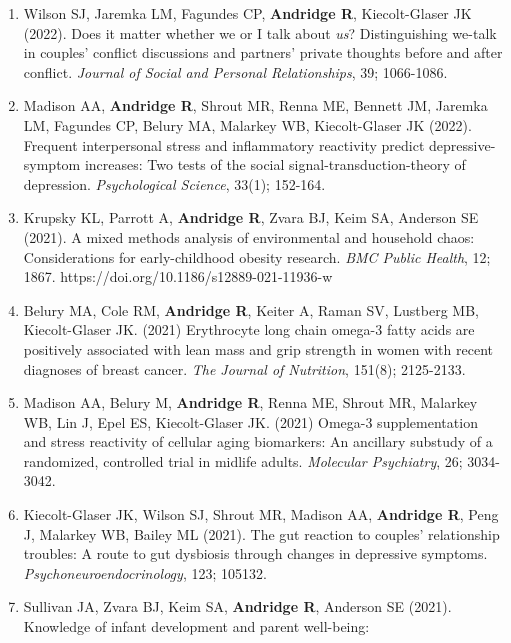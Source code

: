 \documentclass[
  english,
  letterpaper,
  DIV=11,
  numbers=noendperiod]{scrartcl}
\begin{document}
\begin{enumerate}
  \textbf{Andridge R}, Lustberg M, DeVries AC, Orchard T. (2022) Effects
  of plant-based versus marine-based omega-3 fatty acids and sucrose on
  brain and liver fatty acids in a mouse model of chemotherapy.
  \emph{Nutritional Neuroscience}, 25(12); 2650-2658.
\item
  Wilson SJ, Jaremka LM, Fagundes CP, \textbf{Andridge R},
  Kiecolt-Glaser JK (2022). Does it matter whether we or I talk about
  \emph{us}? Distinguishing we-talk in couples' conflict discussions and
  partners' private thoughts before and after conflict. \emph{Journal of
  Social and Personal Relationships}, 39; 1066-1086.
\item
  Madison AA, \textbf{Andridge R}, Shrout MR, Renna ME, Bennett JM,
  Jaremka LM, Fagundes CP, Belury MA, Malarkey WB, Kiecolt-Glaser JK
  (2022). Frequent interpersonal stress and inflammatory reactivity
  predict depressive-symptom increases: Two tests of the social
  signal-transduction-theory of depression. \emph{Psychological
  Science}, 33(1); 152-164.
\item
  Krupsky KL, Parrott A, \textbf{Andridge R}, Zvara BJ, Keim SA,
  Anderson SE (2021). A mixed methods analysis of environmental and
  household chaos: Considerations for early-childhood obesity research.
  \emph{BMC Public Health}, 12; 1867.
  https://doi.org/10.1186/s12889-021-11936-w
\item
  Belury MA, Cole RM, \textbf{Andridge R}, Keiter A, Raman SV, Lustberg
  MB, Kiecolt-Glaser JK. (2021) Erythrocyte long chain omega-3 fatty
  acids are positively associated with lean mass and grip strength in
  women with recent diagnoses of breast cancer. \emph{The Journal of
  Nutrition}, 151(8); 2125-2133.
\item
  Madison AA, Belury M, \textbf{Andridge R}, Renna ME, Shrout MR,
  Malarkey WB, Lin J, Epel ES, Kiecolt-Glaser JK. (2021) Omega-3
  supplementation and stress reactivity of cellular aging biomarkers: An
  ancillary substudy of a randomized, controlled trial in midlife
  adults. \emph{Molecular Psychiatry}, 26; 3034-3042.
\item
  Kiecolt-Glaser JK, Wilson SJ, Shrout MR, Madison AA, \textbf{Andridge
  R}, Peng J, Malarkey WB, Bailey ML (2021). The gut reaction to
  couples' relationship troubles: A route to gut dysbiosis through
  changes in depressive symptoms. \emph{Psychoneuroendocrinology}, 123;
  105132.
\item
  Sullivan JA, Zvara BJ, Keim SA, \textbf{Andridge R}, Anderson SE
  (2021). Knowledge of infant development and parent well-being:

\end{enumerate}
\end{document}
